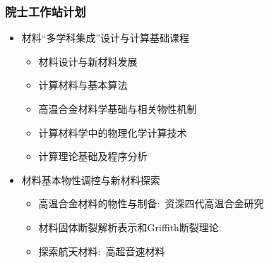 \small
\frame
{
	\frametitle{院士工作站计划}
	\begin{itemize}
		\item 材料``多学科集成''设计与计算基础课程
			\begin{itemize}
				\item 材料设计与新材料发展
				\item 计算材料与基本算法
				\item 高温合金材料学基础与相关物性机制
				\item 计算材料学中的物理化学计算技术
				\item 计算理论基础及程序分析
			\end{itemize}
		\item 材料基本物性调控与新材料探索
			\begin{itemize}
				\item 高温合金材料的物性与制备:~资深四代高温合金研究
				\item 材料固体断裂解析表示和\textrm{Griffith}断裂理论
				\item 探索航天材料:~高超音速材料
			\end{itemize}
	\end{itemize}
}

